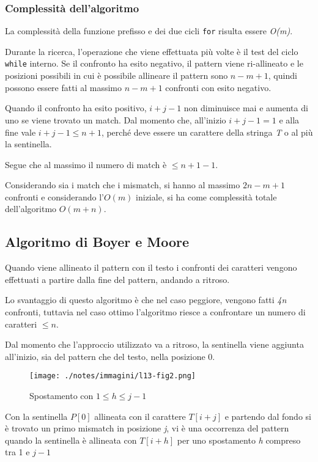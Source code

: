 \subsubsection{Complessità dell'algoritmo}\label{complessituxe0-dellalgoritmo}

La complessità della funzione prefisso e dei due cicli \texttt{for}
risulta essere \emph{O(m)}.

Durante la ricerca, l'operazione che viene effettuata più volte è il test del ciclo \texttt{while} interno. 
Se il confronto ha esito negativo, il pattern viene ri-allineato e le posizioni possibili in cui è possibile allineare il pattern sono $n - m +1$, quindi possono essere fatti al massimo $n - m +1$ confronti con esito negativo.

Quando il confronto ha esito positivo, $i + j - 1$ non diminuisce mai e aumenta di uno se viene trovato un match. Dal momento che, all'inizio $i + j - 1 = 1$ e alla fine vale $i + j -1\leq n+1$, perché
deve essere un carattere della stringa \emph{T} o al più la sentinella.

Segue che al massimo il numero di match è $\leq n + 1 - 1$.

Considerando sia i match che i mismatch, si hanno al massimo $2n-m+1$ confronti e considerando l'$O(m)$ iniziale, si ha come
complessità totale dell'algoritmo $O(m+n)$.

\subsection{Algoritmo di Boyer e Moore}\label{algoritmo-di-boyer-e-moore}

Quando viene allineato il pattern con il testo i confronti dei
caratteri vengono effettuati a partire dalla fine del pattern, andando a
ritroso.

Lo svantaggio di questo algoritmo è che nel caso peggiore, vengono fatti
\emph{4n} confronti, tuttavia nel caso ottimo l'algoritmo riesce a
confrontare un numero di caratteri $\leq n$.

Dal momento che l'approccio utilizzato va a ritroso, la sentinella viene
aggiunta all'inizio, sia del pattern che del testo, nella posizione 0.

\begin{figure}[htbp]
\centering
\texttt{[image: ./notes/immagini/l13-fig2.png]}
\caption{Spostamento con $ 1 \leq h \leq j-1 $}
\end{figure}

Con la sentinella $P[0]$ allineata con il carattere $T[i+j]$ e partendo dal fondo si è trovato un primo mismatch in posizione \emph{j}, vi è una occorrenza del pattern quando la
sentinella è allineata con $T[i+h]$ per uno spostamento
\emph{h} compreso tra 1 e $j-1$

